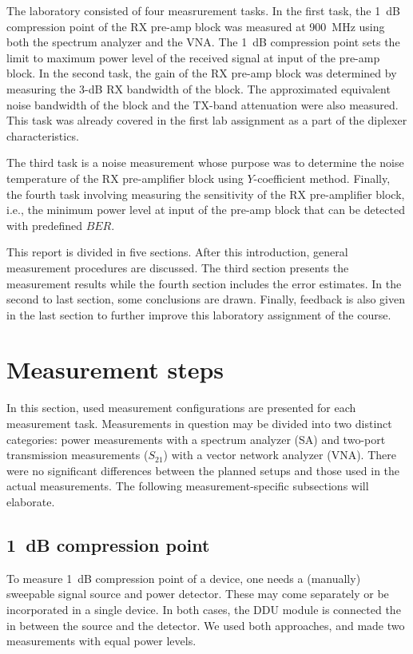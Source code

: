 \documentclass[a4paper, 12pt]{article}
\begin{document}
The laboratory consisted of four measrurement tasks. In the first task, the 1~dB compression 
point of the RX pre-amp block was measured at 900~MHz using both the spectrum analyzer and the 
VNA. The 1~dB compression point sets the limit to maximum power level of the received signal 
at input of the pre-amp block. In the second task, the gain of the RX pre-amp block was 
determined by measuring the 3-dB RX bandwidth of the block. The approximated equivalent 
noise bandwidth of the block and the TX-band attenuation were also measured. This task was 
already covered in the first lab assignment as a part of the diplexer characteristics. 

The third task is a noise measurement whose purpose was to determine the noise temperature of 
the RX pre-amplifier block using $Y$-coefficient method. Finally, the fourth task involving 
measuring the sensitivity of the RX pre-amplifier block, i.e., the minimum power level at 
input of the pre-amp block that can be detected with predefined $\textit{BER}$.

This report is divided in five sections. After this introduction, general measurement procedures 
are discussed. The third section presents the measurement results while the fourth section includes 
the error estimates. In the second to last section, some conclusions are drawn. Finally, feedback 
is also given in the last section to further improve this laboratory assignment of the course.


\newpage
\section{Measurement steps}

In this section, used measurement configurations are presented for each measurement 
task. Measurements in question may be divided into two distinct categories: power 
measurements with a spectrum analyzer (SA) and two-port transmission measurements ($S_{21}$)
with a vector network analyzer (VNA). There were no significant differences between 
the planned setups and those used in the actual measurements. The following 
measurement-specific subsections will elaborate.


\subsection{1~dB compression point}

To measure 1~dB compression point of a device, one needs a (manually) sweepable signal source 
and power detector. These may come separately or be incorporated in a single device. 
In both cases, the DDU module is connected the in between the source and the detector.
We used both approaches, and made two measurements with equal power levels.
\end{document}
